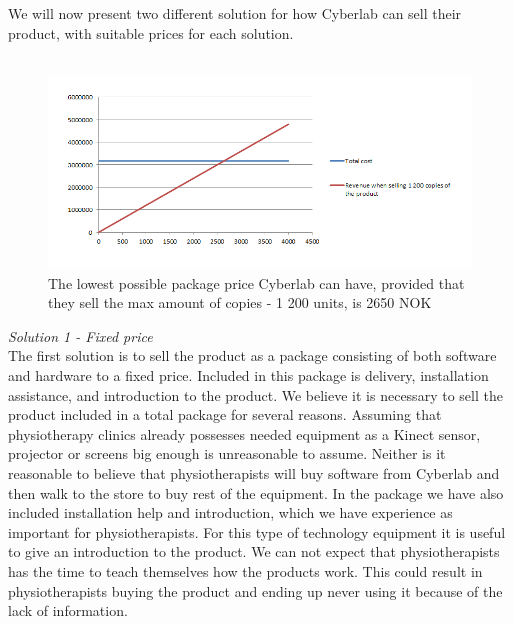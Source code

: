 We will now present two different solution for how Cyberlab can sell their product, with suitable prices for each solution.\\ \\
\begin{figure}
\label{fig:RevenueStreamPrice}
\begin{center}
\includegraphics[scale=0.7]{revenuestreamprice}
\caption[Price example]{The lowest possible package price Cyberlab can have, provided that they sell the max amount of  copies - 1 200 units, is 2650 NOK}
\end{center}
\end{figure}
\emph{Solution 1 - Fixed price}\\ 
The first solution is to sell the product as a package consisting of both software and hardware to a fixed price. Included in this package is delivery, installation assistance, and introduction to the product. We believe it is necessary  to sell the product included in a total package for several reasons. Assuming that physiotherapy clinics already possesses needed equipment as a Kinect sensor, projector or screens big enough is unreasonable to assume. Neither is it reasonable to believe that physiotherapists will buy software from Cyberlab and then walk to the store to buy rest of the equipment. In the package we have also included installation help and introduction, which we have experience as important for physiotherapists. For this type of technology equipment it is useful to give an introduction to the product. We can not expect that physiotherapists has the time to teach themselves how the products work. This could result in physiotherapists buying the product and ending up never using it because of the lack of information. \\ \\
